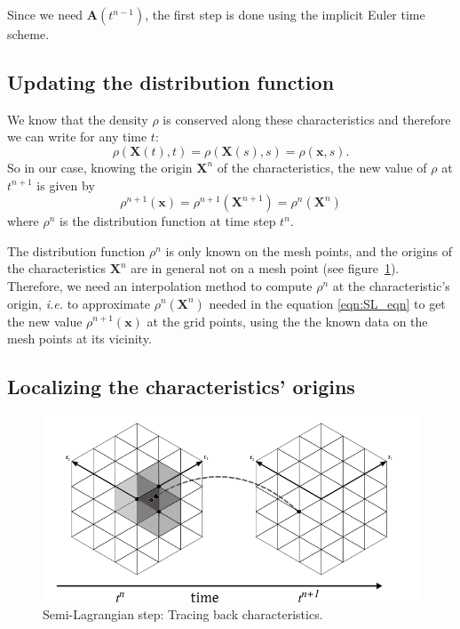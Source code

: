 \documentclass[proc]{edpsmath}
\begin{document}
\rmrk Since we need $\textbf{A}(t^{n-1})$, the first step is done using the  implicit Euler time scheme. 

\subsection{Updating the distribution function}

We know that the density $\rho$ is conserved along these characteristics and therefore we can write for any time $t$:
\begin{equation}
	\rho(\mathbf{X}(t), t) = \rho(\mathbf{X}(s), s)= \rho(\mathbf{x}, s).
\end{equation}
So in our case, knowing the origin $ \mathbf{X}^n$ of the characteristics, the new value of $\rho$ at $t^{n+1}$ is given by
\begin{equation}
\label{eqn:SL_eqn}
	\rho^{n+1} (\mathbf{x}) =\rho^{n+1}(\mathbf{X}^{n+1})= \rho^n(\mathbf{X}^{n})
\end{equation}
where $\rho^n$ is the distribution function at  time step $t^n$.

The distribution function $\rho^n$ is only known on the mesh points, and the origins of the characteristics $ \mathbf{X}^{n}$ are in general not on a mesh point (see figure~\ref{fig:SL_hex}). Therefore, we need an interpolation method to compute $\rho^n$ at the characteristic's origin, \emph{i.e.} to approximate $\rho^n(\mathbf{X}^{n})$ needed in the equation \eqref{eqn:SL_eqn} to get the new value  $\rho^{n+1}( \mathbf{x} )$ at the grid points, using the the known data on the mesh points at its vicinity.


\subsection{Localizing the characteristics' origins}


\begin{figure}[h!]
	\centering
	\includegraphics[scale=0.5]{figures/SL_hex.png} 
	\caption{Semi-Lagrangian step: Tracing back characteristics.}
	\label{fig:SL_hex}
\end{figure}
\end{document}
